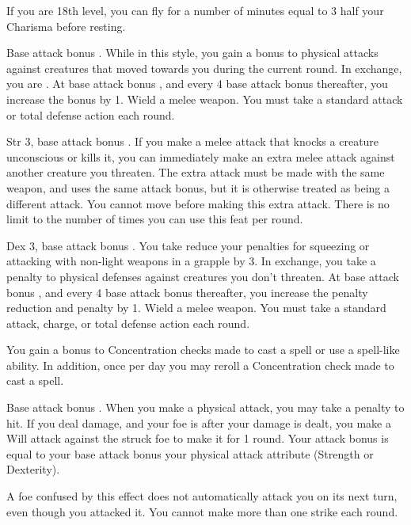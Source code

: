 If you are 18th level, you can fly for a number of minutes equal to 3 \add half your Charisma before resting.

 Base attack bonus .
 While in this style, you gain a  bonus to physical attacks against creatures that moved towards you during the current round. In exchange, you are \immobilized. At base attack bonus , and every 4 base attack bonus thereafter, you increase the bonus by 1.
\stylereq Wield a melee weapon. You must take a standard attack or total defense action each round.

 Str 3, base attack bonus .
 If you make a melee attack that knocks a creature unconscious or kills it, you can immediately make an extra melee attack against another creature you threaten. The extra attack must be made with the same weapon, and uses the same attack bonus, but it is otherwise treated as being a different attack. You cannot move before making this extra attack. There is no limit to the number of times you can use this feat per round.

\featpre Dex 3, base attack bonus .
\featben You take reduce your penalties for squeezing or attacking with non-light weapons in a grapple by 3. In exchange, you take a  penalty to physical defenses against creatures you don't threaten. At base attack bonus , and every 4 base attack bonus thereafter, you increase the penalty reduction and penalty by 1.
\stylereq Wield a melee weapon. You must take a standard attack, charge, or total defense action each round.

 You gain a  bonus to Concentration checks made to cast a spell or use a spell-like ability. In addition, once per day you may reroll a Concentration check made to cast a spell.

\featpre Base attack bonus .
\featben When you make a physical attack, you may take a  penalty to hit. If you deal damage, and your foe is \bloodied after your damage is dealt, you make a Will attack against the struck foe to make it \confused for 1 round. Your attack bonus is equal to your base attack bonus \add your physical attack attribute (Strength or Dexterity).

A foe confused by this effect does not automatically attack you on its next turn, even though you attacked it. You cannot make more than one strike each round.

